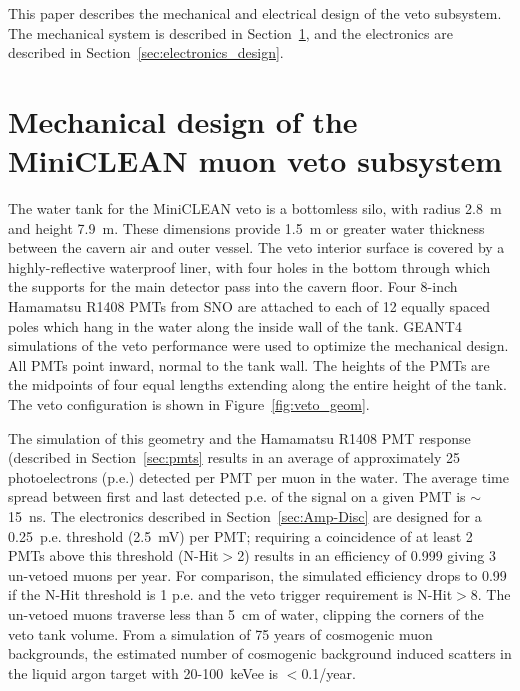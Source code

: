 \documentclass{JINST}
\begin{document}
This paper describes the mechanical and electrical design of the veto
subsystem. The mechanical system is described in
Section~\ref{sec:subsystem_design}, and the electronics are
described in Section~\ref{sec:electronics_design}.


\section{Mechanical design of the MiniCLEAN muon veto subsystem}
\label{sec:subsystem_design}
%
The water tank for the MiniCLEAN veto is a bottomless silo, with
radius 2.8~m and height 7.9~m. These dimensions provide 1.5~m or
greater water thickness between the cavern air and outer vessel. The
veto interior surface is covered by a highly-reflective waterproof liner, with four
holes in the bottom through which the supports for the main detector
pass into the cavern floor. Four 8-inch Hamamatsu R1408 PMTs from SNO are
attached to each of 12 equally spaced poles which hang in the water
along the inside wall of the tank. GEANT4~\cite{ref:geant4} simulations
of the veto performance were used to optimize the mechanical
design. All PMTs point inward, normal to the tank wall. The heights
of the PMTs are the midpoints of four equal lengths extending along
the entire height of the tank. The veto configuration is shown in
Figure~\ref{fig:veto_geom}. 

The simulation of this geometry and the Hamamatsu R1408 PMT response (described
in Section~\ref{sec:pmts} results in an average of approximately 25
photoelectrons (p.e.) detected per PMT per muon in the water. The
average time spread between first and last detected p.e. of the signal
on a given PMT is $\sim$15~ns. The electronics described in
Section~\ref{sec:Amp-Disc} are designed for a 0.25~p.e. threshold (2.5~mV)
per PMT; requiring a coincidence of at least 2 PMTs above this
threshold (N-Hit$>$2) results in an efficiency of 0.999 giving 3
un-vetoed muons per year. For comparison, the simulated efficiency
drops to 0.99 if the N-Hit threshold is 1 p.e. and the veto trigger
requirement is N-Hit$>$8. The un-vetoed muons traverse less than 5~cm
of water, clipping the corners of the veto tank volume. From a
simulation of 75 years of cosmogenic muon backgrounds, the estimated
number of cosmogenic background induced scatters in the liquid argon
target with 20-100~keVee is $<$0.1/year.
\end{document}
